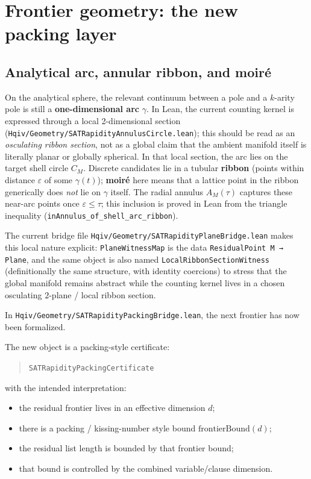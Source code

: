 \documentclass[11pt]{article}
\begin{document}
\section{Frontier geometry: the new packing layer}

\subsection{Analytical arc, annular ribbon, and moiré}

On the analytical sphere, the relevant continuum between a pole and a \(k\)-arity pole
is still a \textbf{one-dimensional arc} \(\gamma\). In Lean, the current counting kernel
is expressed through a local 2-dimensional section
(\texttt{Hqiv/Geometry/SATRapidityAnnulusCircle.lean}); this should be read as an
\emph{osculating ribbon section}, not as a global claim that the ambient manifold itself
is literally planar or globally spherical. In that local section, the arc lies on the target
shell circle \(C_M\). Discrete candidates lie in a tubular \textbf{ribbon} (points
within distance \(\varepsilon\) of some \(\gamma(t)\)); \textbf{moiré} here means
that a lattice point in the ribbon generically does \emph{not} lie on \(\gamma\)
itself. The radial annulus \(A_M(\tau)\) captures these near-arc points once
\(\varepsilon \le \tau\); this inclusion is proved in Lean from the triangle
inequality (\texttt{inAnnulus\_of\_shell\_arc\_ribbon}).

The current bridge file \texttt{Hqiv/Geometry/SATRapidityPlaneBridge.lean} makes this
local nature explicit: \texttt{PlaneWitnessMap} is the data \texttt{ResidualPoint M → Plane},
and the same object is also named \texttt{LocalRibbonSectionWitness} (definitionally the
same structure, with identity coercions) to stress that the global manifold remains abstract
while the counting kernel lives in a chosen osculating \(2\)-plane / local ribbon section.

In \texttt{Hqiv/Geometry/SATRapidityPackingBridge.lean}, the next frontier has now been
formalized.

The new object is a packing-style certificate:

\begin{quote}
\texttt{SATRapidityPackingCertificate}
\end{quote}

with the intended interpretation:

\begin{itemize}[leftmargin=2em]
  \item the residual frontier lives in an effective dimension \(d\);
  \item there is a packing / kissing-number style bound \(\mathrm{frontierBound}(d)\);
  \item the residual list length is bounded by that frontier bound;
  \item that bound is controlled by the combined variable/clause dimension.
\end{itemize}
\end{document}
